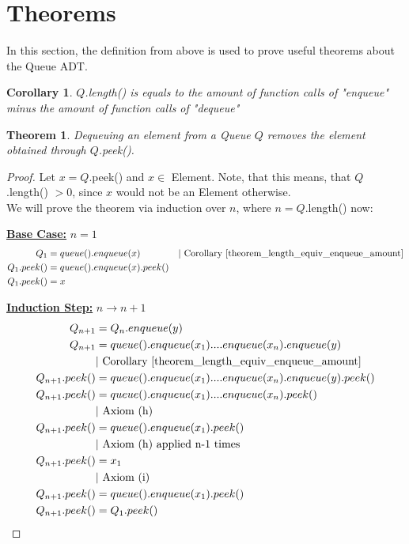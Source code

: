 \documentclass{article}
\newtheorem{theorem}{Theorem}
\newtheorem{corollary}{Corollary}
\newcommand{\pparagraph}[1]{\textbf{\underline{#1}}}
\begin{document}
\section*{Theorems}
In this section, the definition from above is used to prove useful theorems about the Queue ADT.

\begin{corollary} \label{theorem_length_equiv_enqueue_amount}
	\(Q\).length() is equals to the amount of function calls of "enqueue" minus the amount of function calls of "dequeue"
\end{corollary}

\begin{theorem}
	Dequeuing an element from a Queue \(Q\) removes the element obtained through \(Q\).peek().
\end{theorem}
\begin{proof}
	Let \(x = Q\).peek() and \(x \in\) Element. Note, that this means, that \(Q\).length() \(> 0\), since \(x\) would not be an Element otherwise. \\
	We will prove the theorem via induction over \(n\), where \(n = Q\).length() now:
	
	\pparagraph{Base Case:} \(n = 1\)
	\begin{align*}
		Q_1 &= queue().enqueue(x) &| \text{ Corollary \ref{theorem_length_equiv_enqueue_amount}} \\
		Q_1.peek() &= queue().enqueue(x).peek() \\
		Q_1.peek() &= x
	\end{align*}
	
	\pparagraph{Induction Step:} \(n \rightarrow n+1\)
	\begin{align*}
		Q_{n+1} &= Q_n.enqueue(y) \\
		Q_{n+1} &= queue().enqueue(x_1)....enqueue(x_n).enqueue(y) \\
		&| \text{ Corollary \ref{theorem_length_equiv_enqueue_amount}} \\
		Q_{n+1}.peek() &= queue().enqueue(x_1)....enqueue(x_n).enqueue(y).peek() \\
		Q_{n+1}.peek() &= queue().enqueue(x_1)....enqueue(x_n).peek() \\
		&| \text{ Axiom (h)} \\
		Q_{n+1}.peek() &= queue().enqueue(x_1).peek() \\
		&| \text{ Axiom (h) applied n-1 times} \\
		Q_{n+1}.peek() &= x_1 \\
		&| \text{ Axiom (i)} \\
		Q_{n+1}.peek() &= queue().enqueue(x_1).peek() \\
		Q_{n+1}.peek() &= Q_1.peek()
	\end{align*}
\end{proof}
	
\end{document}
